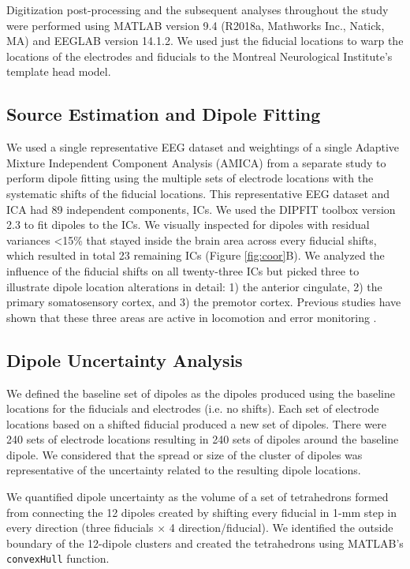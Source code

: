 \documentclass[../thesis_seyed.tex]{subfiles}
\begin{document}
Digitization post-processing and the subsequent analyses throughout the study were performed using MATLAB version 9.4 (R2018a, Mathworks Inc., Natick, MA) and EEGLAB \cite{Delorme2004-yy} version 14.1.2. We used just the fiducial locations to warp the locations of the electrodes and fiducials to the Montreal Neurological Institute's template head model.

\subsection{Source Estimation and Dipole Fitting}
We used a single representative EEG dataset and weightings of a single Adaptive Mixture Independent Component Analysis (AMICA) from a separate study to perform dipole fitting using the multiple sets of electrode locations with the systematic shifts of the fiducial locations. This representative EEG dataset and ICA had 89 independent components, ICs. We used the DIPFIT toolbox version 2.3 to fit dipoles to the ICs. We visually inspected for dipoles with residual variances <15\% that stayed inside the brain area across every fiducial shifts, which resulted in total 23 remaining ICs (Figure \ref{fig:coor}B). We analyzed the influence of the fiducial shifts on all twenty-three ICs but picked three to illustrate dipole location alterations in detail: 1) the anterior cingulate, 2) the primary somatosensory cortex, and 3) the premotor cortex. Previous studies have shown that these three areas are active in locomotion and error monitoring \cite{Luu2017-ph,Peterson2018-ht}.

\subsection{Dipole Uncertainty Analysis}
We defined the baseline set of dipoles as the dipoles produced using the baseline locations for the fiducials and electrodes (i.e. no shifts). Each set of electrode locations based on a shifted fiducial produced a new set of dipoles. There were 240 sets of electrode locations resulting in 240 sets of dipoles around the baseline dipole. We considered that the spread or size of the cluster of dipoles was representative of the uncertainty related to the resulting dipole locations.

We quantified dipole uncertainty as the volume of a set of tetrahedrons formed from connecting the 12 dipoles created by shifting every fiducial in 1-mm step in every direction (three fiducials $\times$ 4 direction/fiducial). We identified the outside boundary of the 12-dipole clusters and created the tetrahedrons using MATLAB's {\tt convexHull} function.
\end{document}
